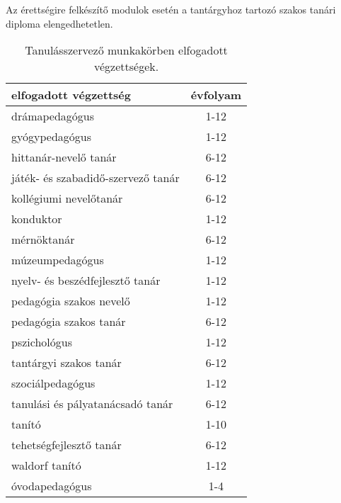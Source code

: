 Az érettségire felkészítő modulok esetén a tantárgyhoz tartozó szakos tanári
diploma elengedhetetlen.

\begin{table}[h]
    \begin{tabular}{l | c}
        \textbf{elfogadott végzettség}     & \textbf{évfolyam}
        \\ \hline \hline
        drámapedagógus                     & 1-12              \\ \hline
        gyógypedagógus                     & 1-12              \\ \hline
        hittanár-nevelő tanár              & 6-12              \\ \hline
        játék- és szabadidő-szervező tanár & 6-12              \\ \hline
        kollégiumi nevelőtanár             & 6-12              \\ \hline
        konduktor                          & 1-12              \\ \hline
        mérnöktanár                        & 6-12              \\ \hline
        múzeumpedagógus                    & 1-12              \\ \hline
        nyelv- és beszédfejlesztő tanár    & 1-12              \\ \hline
        pedagógia szakos nevelő            & 1-12              \\ \hline
        pedagógia szakos tanár             & 6-12              \\ \hline
        pszichológus                       & 1-12              \\ \hline
        tantárgyi szakos tanár             & 6-12              \\ \hline
        szociálpedagógus                   & 1-12              \\ \hline
        tanulási és pályatanácsadó tanár   & 6-12              \\ \hline
        tanító                             & 1-10              \\ \hline
        tehetségfejlesztő tanár            & 6-12              \\ \hline
        waldorf tanító                     & 1-12              \\ \hline
        óvodapedagógus                     & 1-4               \\ \hline
    \end{tabular}
    \caption{Tanulásszervező munkakörben elfogadott végzettségek.}
    \label{tbl:vegzettsegek}
\end{table}

